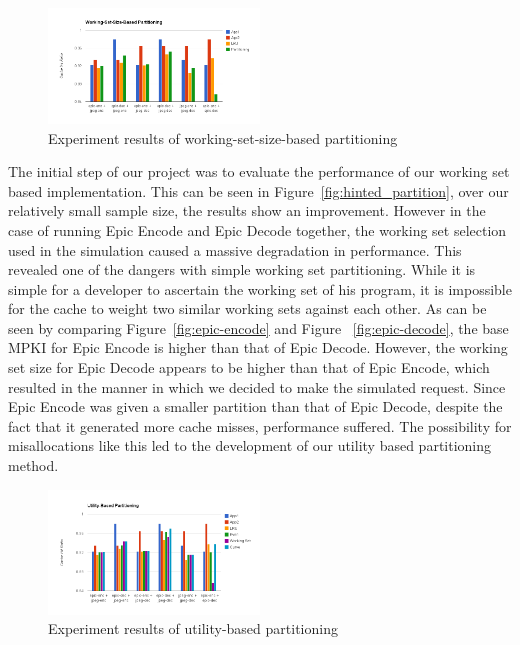 \documentclass{acm_proc_article-sp}
\begin{document}
\begin{figure}
  \includegraphics[width=0.5\textwidth]{figs/work_set_size_hit_ratio.png}
  \caption{Experiment results of working-set-size-based partitioning}
  \label{fig:work_set_results}
\end{figure}

The initial step of our project was to evaluate the performance of our working set based implementation. This can be seen in Figure~\ref{fig:hinted_partition}, over our relatively small sample size, the results show an improvement. However in the case of running Epic Encode and Epic Decode together, the working set selection used in the simulation caused a 
massive degradation in performance. This revealed one of the dangers with simple working set partitioning. While it is simple for a developer to ascertain the working set of his program, it is impossible for the cache to weight two similar working sets against each other. As can be seen by comparing  Figure~\ref{fig:epic-encode} and Figure ~\ref{fig:epic-decode}, the base MPKI for Epic Encode is higher than that of Epic Decode. However, the working set size for Epic Decode appears to be higher than that of Epic Encode, which resulted in the manner in which we decided to make the simulated request. Since Epic Encode was given a smaller partition than that of Epic Decode, despite the fact that it generated more cache misses, performance suffered. The possibility for misallocations like this led to the development of our utility based partitioning method.

\begin{figure}
  \includegraphics[width=0.5\textwidth]{figs/utility_hit_ratio.png}
  \caption{Experiment results of utility-based partitioning}
  \label{fig:utility_results}
\end{figure}
\end{document}
